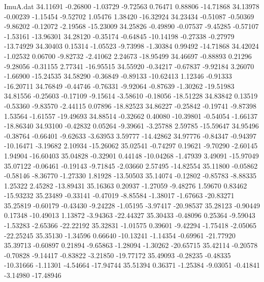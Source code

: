 \begin{filecontents}{ImuA.dat}
  34.11691   -0.26800   -1.03729   -9.72563    0.76471    0.88806  -14.71868
  34.13978   -0.00239   -1.15454   -9.52702    1.05476    1.38420  -16.32924
  34.23434   -0.51087   -0.50369   -9.86202   -0.12072   -2.19568  -15.23009
  34.25826   -0.49890   -0.07537   -9.45285   -0.57107   -1.53161  -13.96301
  34.28120   -0.35174   -0.64845  -10.14198   -0.27338   -0.27979  -13.74929
  34.30403    0.15314   -1.05523   -9.73998   -1.30384    0.99492  -14.71868
  34.42024   -1.02532    0.06700   -9.82732   -2.41062    2.24673  -18.95499
  34.46697   -0.88893    0.21296   -9.28056   -0.31155    2.77341  -16.95515
  34.55920   -0.34217   -0.67837   -9.92184    3.26070   -1.66900  -15.24535
  34.58290   -0.36849   -0.89133  -10.62413    1.12346   -0.91333  -16.20711
  34.76849   -0.44746   -0.76331   -9.92064   -0.87639   -1.30262  -19.51983
  34.81556   -0.25603   -0.17109   -9.15614   -3.58610   -0.18056  -18.51228
  34.83842    0.13519   -0.53360   -9.83570   -2.44115    0.07896  -18.82523
  34.86227   -0.25842   -0.19741   -9.87398    1.53564   -1.61557  -19.49693
  34.88514   -0.32662    0.40080  -10.39801   -0.54054   -1.66137  -18.86340
  34.93100   -0.42832    0.05264   -9.39661   -3.25788    2.59785  -15.59647
  34.95496   -0.38764   -0.66401   -9.62633   -3.63953    3.59777  -14.42862
  34.97776   -0.84347   -0.94397  -10.16471   -3.19682    2.10934  -15.26062
  35.02541   -0.74297    0.19621   -9.70290   -2.60145    1.94904  -16.60403
  35.04828   -0.32901    0.44148  -10.04268   -1.47939    3.49091  -15.97049
  35.07122   -0.06461   -0.19143   -9.71845   -2.03660    2.57495  -14.82554
  35.11800   -0.05862   -0.58146   -8.36770   -1.27330    1.81928  -13.50503
  35.14074   -0.12802   -0.85783   -8.88335    1.25322    2.45282  -13.89431
  35.16363    0.20937   -1.27059   -9.48276    1.59670    0.83462  -15.93232
  35.23489   -0.33141   -0.47019   -8.85584   -1.38017   -1.67663  -20.83271
  35.25819   -0.60179   -0.43430   -9.24228   -1.05195   -3.97417  -20.98537
  35.28123   -0.90449    0.17348  -10.49013    1.13872   -3.94363  -22.44327
  35.30433   -0.48096    0.25364   -9.59043   -1.53283   -2.65366  -22.22192
  35.32831   -1.01575    0.39601   -9.42294   -1.75418   -2.05065  -22.25245
  35.35130   -1.34596    0.66640  -10.13241   -1.14354   -0.69961  -21.77920
  35.39713   -0.60897    0.21894   -9.65863   -1.28094   -1.30262  -20.65715
  35.42114   -0.20578   -0.70828   -9.14417   -0.83822   -3.21850  -19.77172
  35.49093   -0.28235   -0.48335  -10.31666   -1.11301   -4.54664  -17.94744
  35.51394    0.36371   -1.25384   -9.03051   -0.41841   -3.14980  -17.48946

\end{filecontents}
